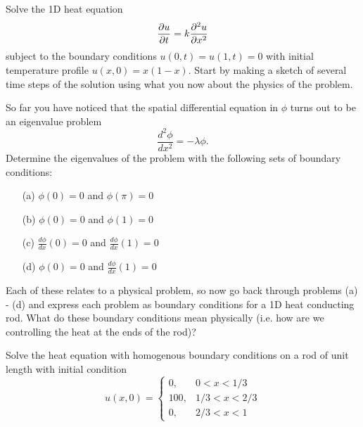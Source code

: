 \begin{problem}
    Solve the 1D heat equation 
    \[ \frac{\partial u}{\partial t} = k \frac{\partial^2 u}{\partial x^2} \]
    subject to the boundary conditions $u(0,t) = u(1,t) = 0$ with initial temperature
    profile $u(x,0) = x(1-x)$.  Start by making a sketch of several time steps of
    the solution using what you now about the physics of the problem.
\end{problem}

\begin{problem}
    So far you have noticed that the spatial differential equation in $\phi$ turns out to
    be an eigenvalue problem 
    \[ \frac{d^2 \phi}{dx^2} = -\lambda \phi.\]
    Determine the eigenvalues of the problem with the following sets of boundary
    conditions:
    \begin{enumerate}
        \item[(a)] $\phi(0) = 0$ and $\phi(\pi) = 0$
        \item[(b)] $\phi(0) = 0$ and $\phi(1) = 0$
        \item[(c)] $\frac{d\phi}{dx}(0) = 0$ and $\frac{d\phi}{dx}(1) = 0$
        \item[(d)] $\phi(0) = 0$ and $\frac{d\phi}{dx}(1) = 0$
    \end{enumerate}
    Each of these relates to a physical problem, so now go back through problems (a) - (d)
    and express each problem as boundary conditions for a 1D heat conducting rod.  What do
    these boundary conditions mean physically (i.e. how are we controlling the heat at the
    ends of the rod)?
\end{problem}

\begin{problem}
    Solve the heat equation with homogenous boundary conditions on a rod of unit length
    with initial condition
    \[ u(x,0) = \left\{ \begin{array}{ll} 0, & 0 < x < 1/3 \\ 100, & 1/3 < x < 2/3 \\ 0,
        & 2/3 < x < 1 \end{array} \right. \]
\end{problem}

